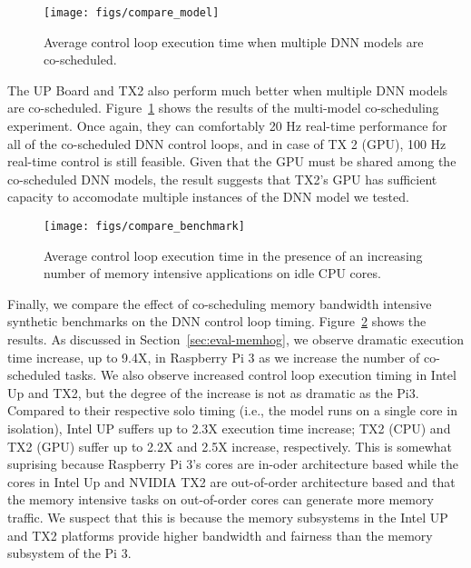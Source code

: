 \begin{figure}[h]
  \centering
  \texttt{[image: figs/compare\_model]}
  \caption{Average control loop execution time when multiple DNN
    models are co-scheduled. }
  \label{fig:sys_model}
\end{figure}

The UP Board and TX2 also perform much better when multiple DNN models
are co-scheduled. Figure~\ref{fig:sys_model} shows the results of the
multi-model co-scheduling experiment. Once again, they can comfortably
20 Hz real-time performance for all of the co-scheduled DNN control
loops, and in case of TX 2 (GPU), 100 Hz real-time control is still
feasible. Given that the GPU must be shared among the co-scheduled DNN
models, the result suggests that TX2's GPU has sufficient capacity to
accomodate multiple instances of the DNN model we tested.


\begin{figure}[h]
  \centering
  \texttt{[image: figs/compare\_benchmark]}
  \caption{Average control loop execution time in the presence of an
    increasing number of memory intensive applications on idle CPU cores.}
  \label{fig:sys_bench}
\end{figure} 

Finally, we compare the effect of co-scheduling memory bandwidth
intensive synthetic benchmarks on the DNN control loop timing. 
Figure~\ref{fig:sys_bench} shows the results.
As discussed in 
Section~\ref{sec:eval-memhog}, we observe dramatic execution time
increase, up to 9.4X, in Raspberry Pi 3 as we increase the number of
co-scheduled tasks. We also observe increased control loop execution
timing in Intel Up and TX2, but the degree of the increase is not as
dramatic as the Pi3. Compared to their respective solo timing (i.e.,
the model runs on a single core in isolation), Intel UP suffers up to
2.3X execution time increase; TX2 (CPU) and TX2 (GPU) suffer up to
2.2X and 2.5X increase, respectively. This is somewhat suprising
because Raspberry Pi 3's cores are in-oder architecture based while
the cores in Intel Up and NVIDIA TX2 are out-of-order architecture
based and that the memory intensive tasks on out-of-order cores can
generate more memory traffic. We suspect that this is because the
memory subsystems in the Intel UP and TX2 platforms provide higher
bandwidth and fairness than the memory subsystem of the Pi 3.

